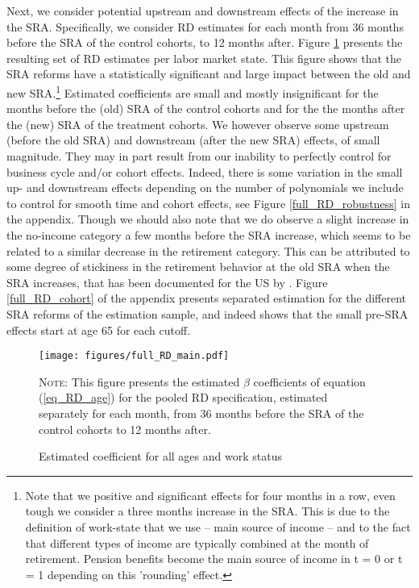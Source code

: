 \documentclass[12pt,a4paper]{article}
\begin{document}
Next, we consider potential upstream and downstream effects of the increase in the SRA. Specifically, we consider RD estimates for each month from 36 months before the SRA of the control cohorts, to 12 months after. Figure \ref{full_RD_main} presents the resulting set of RD estimates per labor market state. This figure shows that the SRA reforms  have a statistically significant and large impact between the old and new SRA.\footnote{Note that we positive and significant effects for four months in a row, even tough we consider a three months increase in the SRA. This is due to the definition of work-state that we use -- main source of income -- and to the fact that different types of income are typically combined at the month of retirement. Pension benefits become the main source of income in t = 0 or t = 1 depending on this 'rounding' effect.} Estimated coefficients are small and mostly insignificant for the months before the (old) SRA of the control cohorts and for the the months after the (new) SRA of the treatment cohorts.
We however observe some upstream (before the old SRA) and downstream (after the new SRA) effects, of small magnitude. They may in part result from our inability to perfectly control for business cycle and/or cohort effects. Indeed, there is some variation in the small up- and downstream effects depending on the number of polynomials we include to control for smooth time and cohort effects, see Figure \ref{full_RD_robustness} in the appendix. Though we should also note that we do observe a slight increase in the no-income category a few months before the SRA increase, which seems to be related to a similar decrease in the retirement category. This can be attributed to some degree of stickiness in the retirement behavior at the old SRA when the SRA increases, that has been documented for the US by \cite{deshpande2020sticky}. Figure \ref{full_RD_cohort} of the appendix presents separated estimation for the different SRA reforms of the estimation sample, and indeed shows that the small pre-SRA effects start at age 65 for each cutoff.   %


\begin{figure}[!t]
\begin{adjustwidth}{-1in}{-1in}	
\caption{Estimated coefficient for all ages and work status}
\label{full_RD_main}
\centering
\texttt{[image: figures/full\_RD\_main.pdf]}
\end{adjustwidth}
\begin{minipage}{14cm}%
\scriptsize
\textsc{Note:} This figure presents the estimated $\beta$ coefficients of equation (\ref{eq_RD_age}) for the pooled RD specification, estimated separately for each month, from 36 months before the SRA of the control cohorts to 12 months after. 
\end{minipage}%
\end{figure}
\end{document}
